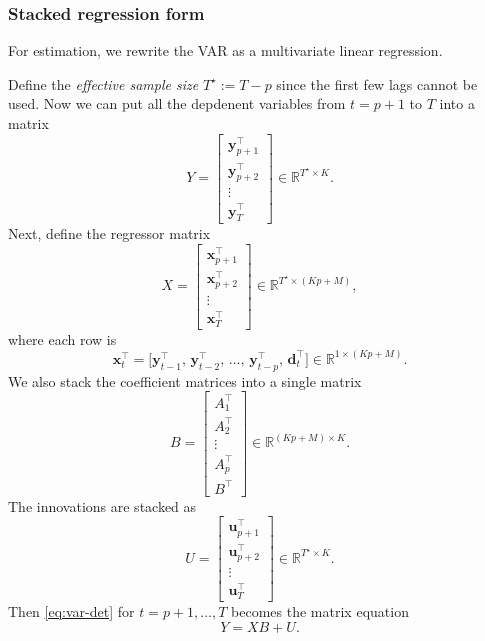 \documentclass[11pt]{article}
\begin{document}
\subsubsection{Stacked regression form}

For estimation, we rewrite the VAR as a multivariate linear regression.

Define the \emph{effective sample size} $T^\star := T - p$ since the first few lags cannot be used. Now we can 
put all the depdenent variables from $t = p+1$ to $T$ into a matrix
\begin{equation}
  Y
  = \begin{bmatrix}
      \mathbf{y}_{p+1}^\top \\
      \mathbf{y}_{p+2}^\top \\
      \vdots \\
      \mathbf{y}_{T}^\top
    \end{bmatrix}
  \in \mathbb{R}^{T^\star \times K}.
\end{equation}
Next, define the regressor matrix
\begin{equation}
  X
  = \begin{bmatrix}
      \mathbf{x}_{p+1}^\top \\
      \mathbf{x}_{p+2}^\top \\
      \vdots \\
      \mathbf{x}_{T}^\top
    \end{bmatrix}
  \in \mathbb{R}^{T^\star \times (Kp + M)},
\end{equation}
where each row is
\begin{equation}
  \mathbf{x}_t^\top
  = \big[
      \mathbf{y}_{t-1}^\top,\,
      \mathbf{y}_{t-2}^\top,\,
      \dots,\,
      \mathbf{y}_{t-p}^\top,\,
      \mathbf{d}_t^\top
    \big]
  \in \mathbb{R}^{1 \times (Kp + M)}.
\end{equation}
We also stack the coefficient matrices into a single matrix
\begin{equation}
  B
  = \begin{bmatrix}
      A_1^\top \\
      A_2^\top \\
      \vdots \\
      A_p^\top \\
      B^\top
    \end{bmatrix}
  \in \mathbb{R}^{(Kp + M) \times K}.
\end{equation}
The innovations are stacked as
\begin{equation}
  U
  = \begin{bmatrix}
      \mathbf{u}_{p+1}^\top \\
      \mathbf{u}_{p+2}^\top \\
      \vdots \\
      \mathbf{u}_{T}^\top
    \end{bmatrix}
  \in \mathbb{R}^{T^\star \times K}.
\end{equation}
Then \cref{eq:var-det} for $t = p+1,\dots,T$ becomes the matrix equation
\begin{equation}
  Y = X B + U.
  \label{eq:var-stacked}
\end{equation}
\end{document}
